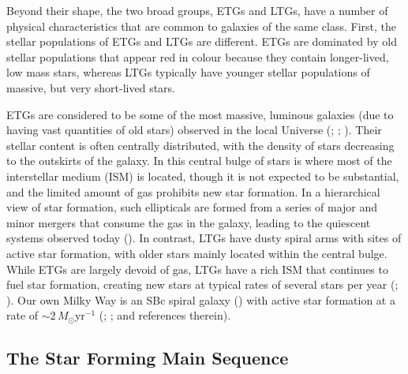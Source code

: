 Beyond their shape, the two broad groups, ETGs and LTGs, have a number of physical characteristics that are common to galaxies of the same class. First, the stellar populations of ETGs and LTGs are different. ETGs are dominated by old stellar populations that appear red in colour because they contain longer-lived, low mass stars, whereas LTGs typically have younger stellar populations of massive, but very short-lived stars.

ETGs are considered to be some of the most massive, luminous galaxies (due to having vast quantities of old stars) observed in the local Universe (\citealt{Bernardi_2003}; \citealt{Kelvin_2014}; \citealt{Moffett_2016}). Their stellar content is often centrally distributed, with the density of stars decreasing to the outskirts of the galaxy. In this central bulge of stars is where most of the interstellar medium (ISM) is located, though it is not expected to be substantial, and the limited amount of gas prohibits new star formation. In a hierarchical view of star formation, such ellipticals are formed from a series of major and minor mergers that consume the gas in the galaxy, leading to the quiescent systems observed today (\citealt{Toomre_1972}). In contrast, LTGs have dusty spiral arms with sites of active star formation, with older stars mainly located within the central bulge. While ETGs are largely devoid of gas, LTGs have a rich ISM that continues to fuel star formation, creating new stars at typical rates of several stars per year (\citealt{Kennicutt_1983}; \citealt{Gao_2004}). Our own Milky Way is an SBc spiral galaxy (\citealt{Gerhard_2002}) with active star formation at a rate of $\sim 2\,M_\odot$yr$^{-1}$ (\citealt{Noriega-Crespo_2013}; \citealt{Licquia_2015}; \citealt{Elia_2022} and references therein).

\subsection{The Star Forming Main Sequence}

